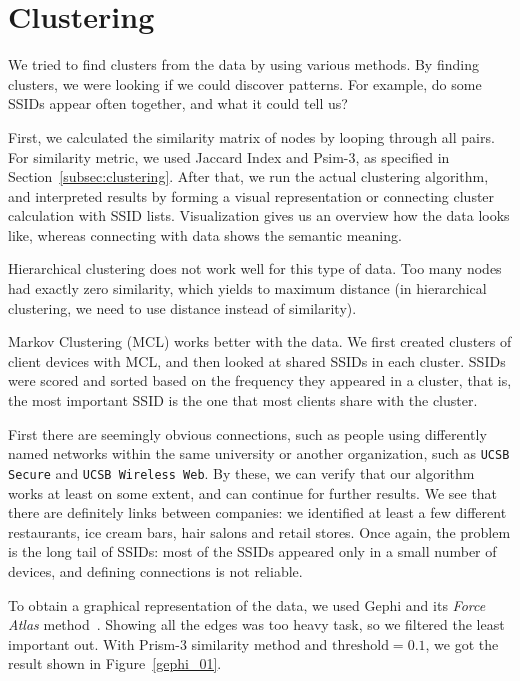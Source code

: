 \documentclass[12pt,a4paper,oneside,pdftex]{report}
\begin{document}
\section{Clustering}
\label{sec:practical_clustering}

We tried to find clusters from the data by using various methods. By finding clusters, we were looking if we could discover patterns. For example, do some SSIDs appear often together, and what it could tell us?

First, we calculated the similarity matrix of nodes by looping through all pairs. For similarity metric, we used Jaccard Index and Psim-3, as specified in Section~\ref{subsec:clustering}. After that, we run the actual clustering algorithm, and interpreted results by forming a visual representation or connecting cluster calculation with SSID lists. Visualization gives us an overview how the data looks like, whereas connecting with data shows the semantic meaning.

Hierarchical clustering does not work well for this type of data. Too many nodes had exactly zero similarity, which yields to maximum distance (in hierarchical clustering, we need to use distance instead of similarity).

Markov Clustering (MCL) works better with the data. We first created clusters of client devices with MCL, and then looked at shared SSIDs in each cluster. SSIDs were scored and sorted based on the frequency they appeared in a cluster, that is, the most important SSID is the one that most clients share with the cluster. 

First there are seemingly obvious connections, such as people using differently named networks within the same university or another organization, such as \texttt{UCSB Secure} and \texttt{UCSB Wireless Web}. By these, we can verify that our algorithm works at least on some extent, and can continue for further results. We see that there are definitely links between companies: we identified at least a few different restaurants, ice cream bars, hair salons and retail stores. Once again, the problem is the long tail of SSIDs: most of the SSIDs appeared only in a small number of devices, and defining connections is not reliable.

To obtain a graphical representation of the data, we used Gephi and its \emph{Force Atlas} method~\cite{bastian2009gephi}. Showing all the edges was too heavy task, so we filtered the least important out. With Prism-3 similarity method and $\text{threshold} = 0.1$, we got the result shown in Figure~\ref{gephi_01}.
\end{document}
